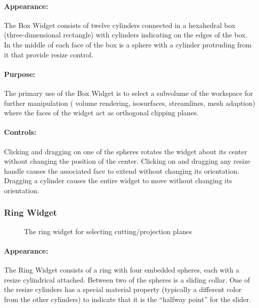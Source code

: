\paragraph{Appearance: } The Box Widget consists of twelve cylinders
connected in a hexahedral box (three-dimensional rectangle) with cylinders
indicating on the edges of the box.  In the middle of each face of the box
is a sphere with a cylinder protruding from it that provide resize control.

\paragraph{Purpose:} The primary use of the Box Widget is to select a
subvolume of the workspace for further manipulation (\eg{} volume
rendering, isosurfaces, streamlines, mesh adaption) where the faces of the
widget act as orthogonal clipping planes.

\paragraph{Controls: } Clicking and dragging on one of the spheres rotates
the widget about its center without changing the position of the center.
Clicking on and dragging any resize handle
causes the associated face to extend without changing its orientation.
Dragging a cylinder causes the entire widget to move without changing its
orientation.

\subsubsection{Ring Widget}
\label{sec:view-ringwidget} 

\begin{figure}[htb]
  \begin{makeimage}
  \end{makeimage}
  \ringwidget
  \caption{\label{fig:boxwidget} The ring widget for selecting
    cutting/projection planes}
\end{figure}


\paragraph{Appearance: } The Ring Widget consists of a ring with four
embedded spheres, each with a resize cylindrical attached.  Between two of
the spheres is a sliding collar.  One of the resize cylinders has a special
material property (typically a different color from the other cylinders) to
indicate that it is the ``halfway point'' for the slider.


